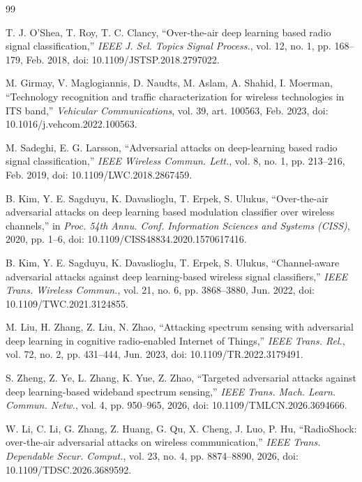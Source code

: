 \documentclass[review]{elsarticle}
\begin{document}
\begin{thebibliography}{99}

 T. J. O'Shea, T. Roy, T. C. Clancy,
``Over-the-air deep learning based radio signal classification,''
\emph{IEEE J. Sel. Topics Signal Process.}, vol. 12, no. 1, pp. 168--179,
Feb. 2018, doi: 10.1109/JSTSP.2018.2797022.

 M. Girmay, V. Maglogiannis, D. Naudts, M. Aslam,
A. Shahid, I. Moerman, ``Technology recognition and traffic characterization
for wireless technologies in ITS band,'' \emph{Vehicular Communications},
vol. 39, art. 100563, Feb. 2023, doi: 10.1016/j.vehcom.2022.100563.

 M. Sadeghi, E. G. Larsson, ``Adversarial attacks on
deep-learning based radio signal classification,'' \emph{IEEE Wireless
Commun. Lett.}, vol. 8, no. 1, pp. 213--216, Feb. 2019,
doi: 10.1109/LWC.2018.2867459.

 B. Kim, Y. E. Sagduyu, K. Davaslioglu, T. Erpek,
S. Ulukus, ``Over-the-air adversarial attacks on deep learning based
modulation classifier over wireless channels,'' in \emph{Proc. 54th Annu.
Conf. Information Sciences and Systems (CISS)}, 2020, pp. 1--6,
doi: 10.1109/CISS48834.2020.1570617416.

 B. Kim, Y. E. Sagduyu, K. Davaslioglu, T. Erpek,
S. Ulukus, ``Channel-aware adversarial attacks against deep learning-based
wireless signal classifiers,'' \emph{IEEE Trans. Wireless Commun.}, vol. 21,
no. 6, pp. 3868--3880, Jun. 2022, doi: 10.1109/TWC.2021.3124855.

 M. Liu, H. Zhang, Z. Liu, N. Zhao, ``Attacking spectrum
sensing with adversarial deep learning in cognitive radio-enabled Internet of
Things,'' \emph{IEEE Trans. Rel.}, vol. 72, no. 2, pp. 431--444, Jun.
2023, doi: 10.1109/TR.2022.3179491.

 S. Zheng, Z. Ye, L. Zhang, K. Yue, Z. Zhao, ``Targeted
adversarial attacks against deep learning-based wideband spectrum sensing,''
\emph{IEEE Trans. Mach. Learn. Commun. Netw.}, vol. 4, pp. 950--965, 2026,
doi: 10.1109/TMLCN.2026.3694666.

 W. Li, C. Li, G. Zhang, Z. Huang, G. Qu, X. Cheng,
J. Luo, P. Hu, ``RadioShock: over-the-air adversarial attacks on wireless
communication,'' \emph{IEEE Trans. Dependable Secur. Comput.}, vol. 23,
no. 4, pp. 8874--8890, 2026, doi: 10.1109/TDSC.2026.3689592.


\end{thebibliography}
\end{document}
